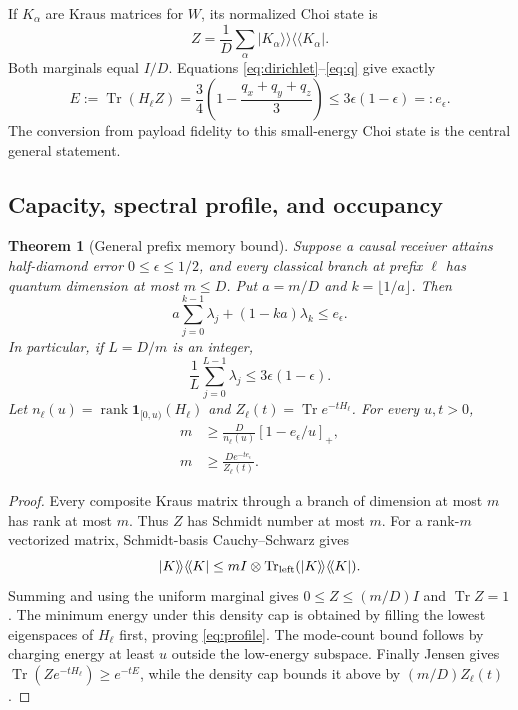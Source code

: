 \documentclass[11pt]{article}
\newtheorem{theorem}{Theorem}
\newcommand{\Tr}{\operatorname{Tr}}
\newcommand{\rank}{\operatorname{rank}}
\begin{document}
If $K_\alpha$ are Kraus matrices for $W$, its normalized Choi state is
\[
 Z=\frac1D\sum_\alpha|K_\alpha\rangle\!\rangle
                      \langle\!\langle K_\alpha|.
\]
Both marginals equal $I/D$. Equations \eqref{eq:dirichlet}--\eqref{eq:q}
give exactly
\begin{equation}
 E:=\Tr(H_\ell Z)=\frac34\left(1-\frac{q_x+q_y+q_z}{3}\right)
 \le3\epsilon(1-\epsilon)=:e_\epsilon.
 \label{eq:energy}
\end{equation}
The conversion from payload fidelity to this small-energy Choi state is the
central general statement.

\subsection{Capacity, spectral profile, and occupancy}

\begin{theorem}[General prefix memory bound]
Suppose a causal receiver attains half-diamond error $0\le\epsilon\le1/2$,
and every classical branch at prefix $\ell$ has quantum dimension at most
$m\le D$. Put $a=m/D$ and $k=\lfloor1/a\rfloor$. Then
\begin{equation}
 a\sum_{j=0}^{k-1}\lambda_j+(1-ka)\lambda_k\le e_\epsilon.
 \label{eq:profile}
\end{equation}
In particular, if $L=D/m$ is an integer,
\begin{equation}
 \frac1L\sum_{j=0}^{L-1}\lambda_j\le3\epsilon(1-\epsilon).
 \label{eq:average}
\end{equation}
Let $n_\ell(u)=\rank\mathbf1_{[0,u)}(H_\ell)$ and
$Z_\ell(t)=\Tr e^{-tH_\ell}$. For every $u,t>0$,
\begin{align}
 m&\ge\frac{D}{n_\ell(u)}[1-e_\epsilon/u]_+,\\
 m&\ge\frac{D e^{-t e_\epsilon}}{Z_\ell(t)}.
 \label{eq:heat}
\end{align}
\end{theorem}

\begin{proof}
Every composite Kraus matrix through a branch of dimension at most $m$ has
rank at most $m$. Thus $Z$ has Schmidt number at most $m$. For a rank-$m$
vectorized matrix, Schmidt-basis Cauchy--Schwarz gives
\[
 |K\rangle\!\rangle\langle\!\langle K|
 \le mI\otimes\Tr_{\rm left}(|K\rangle\!\rangle\langle\!\langle K|).
\]
Summing and using the uniform marginal gives $0\le Z\le(m/D)I$ and
$\Tr Z=1$. The minimum energy under this density cap is obtained by filling
the lowest eigenspaces of $H_\ell$ first, proving \eqref{eq:profile}.
The mode-count bound follows by charging energy at least $u$ outside the
low-energy subspace. Finally Jensen gives
$\Tr(Ze^{-tH_\ell})\ge e^{-tE}$, while the density cap bounds it above by
$(m/D)Z_\ell(t)$.
\end{proof}
\end{document}
